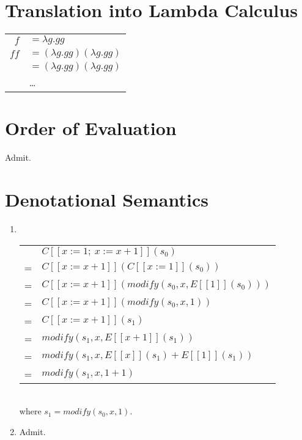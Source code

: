 \section{Translation into Lambda Calculus}
\begin{tabular}{rl}
   $f$ & $ = \lambda g.gg $ \\
  $ff$ & $ = (\lambda g.gg)(\lambda g.gg) $ \\
       & $ = (\lambda g.gg)(\lambda g.gg) $ \\
       & \ldots \\
\end{tabular}


\section{Order of Evaluation}
Admit.


\section{Denotational Semantics}
\begin{enumerate}
  \item \ \\
  \begin{tabular}{rl}
      & $ C[[x:=1;\ x:=x+1]](s_{0}) $ \\
    = & $ C[[x:=x+1]](C[[x:=1]](s_{0})) $ \\
    = & $ C[[x:=x+1]](modify(s_{0}, x, E[[1]](s_{0}))) $ \\
    = & $ C[[x:=x+1]](modify(s_{0}, x, 1)) $ \\
    = & $ C[[x:=x+1]](s_{1}) $ \\
    = & $ modify(s_{1}, x, E[[x+1]](s_{1})) $ \\
    = & $ modify(s_{1}, x, E[[x]](s_{1}) + E[[1]](s_{1})) $ \\
    = & $ modify(s_{1}, x, 1+1) $ \\
  \end{tabular} \\
  where $ s_{1} = modify(s_{0}, x, 1) $.
  
  \item Admit.
\end{enumerate}